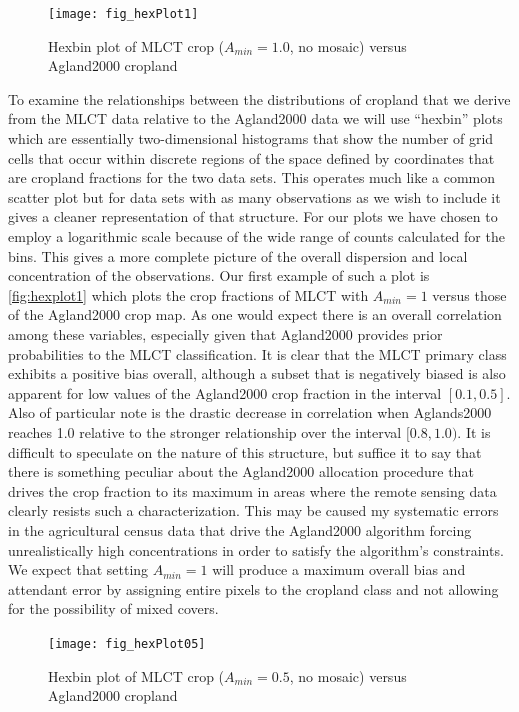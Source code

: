 \begin{figure}[hpt]
  \centering


\texttt{[image: fig\_hexPlot1]}
  \caption{Hexbin plot of MLCT crop ($A_{min}=1.0$, no mosaic) versus Agland2000 cropland}
  \label{fig:hexplot1} 
\end{figure} 

To examine the relationships between the distributions of cropland
that we derive from the MLCT data relative to the Agland2000 data we
will use ``hexbin'' plots which are essentially two-dimensional
histograms that show the number of grid cells that occur within
discrete regions of the space defined by coordinates that are cropland
fractions for the two data sets.  This operates much like a common
scatter plot but for data sets with as many observations as we wish to
include it gives a cleaner representation of that structure.  For our
plots we have chosen to employ a logarithmic scale because of the wide
range of counts calculated for the bins.  This gives a more complete
picture of the overall dispersion and local concentration of the
observations.  Our first example of such a plot is
\autoref{fig:hexplot1} which plots the crop fractions of MLCT with
$A_{min}=1$ versus those of the Agland2000 crop map.  As one would
expect there is an overall correlation among these variables,
especially given that Agland2000 provides prior probabilities to the
MLCT classification.  It is clear that the MLCT primary class
exhibits a positive bias overall, although a subset that is negatively
biased is also apparent for low values of the Agland2000 crop fraction
in the interval $[0.1,0.5]$.  Also of particular note is the drastic
decrease in correlation when Aglands2000 reaches 1.0 relative to the
stronger relationship over the interval $[0.8,1.0)$.  It is difficult
to speculate on the nature of this structure, but suffice it to say
that there is something peculiar about the Agland2000 allocation
procedure that drives the crop fraction to its maximum in areas where
the remote sensing data clearly resists such a characterization.  This
may be caused my systematic errors in the agricultural census data
that drive the Agland2000 algorithm forcing unrealistically high
concentrations in order to satisfy the algorithm's constraints.  We
expect that setting $A_{min}=1$ will produce a maximum overall bias
and attendant error by assigning entire pixels to the cropland class
and not allowing for the possibility of mixed covers.
 



\begin{figure}[hpt]
  \centering



\texttt{[image: fig\_hexPlot05]}
  \caption{Hexbin plot of MLCT crop ($A_{min}=0.5$, no mosaic) versus Agland2000 cropland}
  \label{fig:hexplot05} 
\end{figure} 

